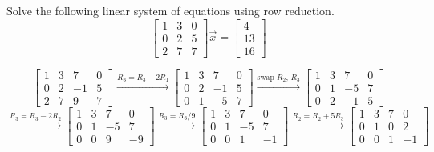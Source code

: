 \begin{example}
	Solve the following linear system of equations using row reduction.
	\begin{equation*}
		\begin{bmatrix}
			1 & 3 & 0 \\
			0 & 2 & 5 \\
			2 & 7 & 7
		\end{bmatrix} \vec{x} = \begin{bmatrix}
			4 \\
			13 \\
			16
		\end{bmatrix}
	\end{equation*}
\end{example}
\begin{equation*}
	\left[
		\begin{array}{ccc|c}
			1 & 3 & 7 & 0 \\
			0 & 2 & -1 & 5 \\
			2 & 7 & 9 & 7
		\end{array}
	\right] \stackrel{R_3 = R_3 - 2R_1}{\to} \left[
		\begin{array}{ccc|c}
			1 & 3 & 7 & 0 \\
			0 & 2 & -1 & 5 \\
			0 & 1 & -5 & 7
		\end{array}
	\right] \stackrel{\text{swap }R_2\text{, }R_3}{\to} \left[
		\begin{array}{ccc|c}
			1 & 3 & 7 & 0 \\
			0 & 1 & -5 & 7 \\
			0 & 2 & -1 & 5
		\end{array}
	\right]
\end{equation*}
\begin{equation*}
	\stackrel{R_3 = R_3 -2R_2}{\to} \left[
		\begin{array}{ccc|c}
			1 & 3 & 7 & 0 \\
			0 & 1 & -5 & 7 \\
			0 & 0 & 9 & -9
		\end{array}
	\right] \stackrel{R_3 = R_3/9}{\to} \left[
		\begin{array}{ccc|c}
			1 & 3 & 7 & 0 \\
			0 & 1 & -5 & 7 \\
			0 & 0 & 1 & -1
		\end{array} 
	\right] \stackrel{R_2 = R_2 + 5R_3}{\to} \left[
		\begin{array}{ccc|c}
			1 & 3 & 7 & 0 \\
			0 & 1 & 0 & 2 \\
			0 & 0 & 1 & -1
		\end{array}
	\right]
\end{equation*}
